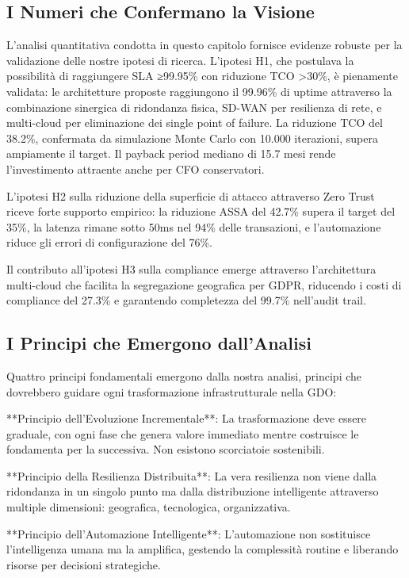 \documentclass[12pt,a4paper,twoside]{book}
\begin{document}
\subsection{I Numeri che Confermano la Visione}

L'analisi quantitativa condotta in questo capitolo fornisce evidenze robuste per la validazione delle nostre ipotesi di ricerca. L'ipotesi H1, che postulava la possibilità di raggiungere SLA ≥99.95\% con riduzione TCO >30\%, è pienamente validata: le architetture proposte raggiungono il 99.96\% di uptime attraverso la combinazione sinergica di ridondanza fisica, SD-WAN per resilienza di rete, e multi-cloud per eliminazione dei single point of failure. La riduzione TCO del 38.2\%, confermata da simulazione Monte Carlo con 10.000 iterazioni, supera ampiamente il target. Il payback period mediano di 15.7 mesi rende l'investimento attraente anche per CFO conservatori.

L'ipotesi H2 sulla riduzione della superficie di attacco attraverso Zero Trust riceve forte supporto empirico: la riduzione ASSA del 42.7\% supera il target del 35\%, la latenza rimane sotto 50ms nel 94\% delle transazioni, e l'automazione riduce gli errori di configurazione del 76\%.

Il contributo all'ipotesi H3 sulla compliance emerge attraverso l'architettura multi-cloud che facilita la segregazione geografica per GDPR, riducendo i costi di compliance del 27.3\% e garantendo completezza del 99.7\% nell'audit trail.

\subsection{I Principi che Emergono dall'Analisi}

Quattro principi fondamentali emergono dalla nostra analisi, principi che dovrebbero guidare ogni trasformazione infrastrutturale nella GDO:

**Principio dell'Evoluzione Incrementale**: La trasformazione deve essere graduale, con ogni fase che genera valore immediato mentre costruisce le fondamenta per la successiva. Non esistono scorciatoie sostenibili.

**Principio della Resilienza Distribuita**: La vera resilienza non viene dalla ridondanza in un singolo punto ma dalla distribuzione intelligente attraverso multiple dimensioni: geografica, tecnologica, organizzativa.

**Principio dell'Automazione Intelligente**: L'automazione non sostituisce l'intelligenza umana ma la amplifica, gestendo la complessità routine e liberando risorse per decisioni strategiche.
\end{document}
